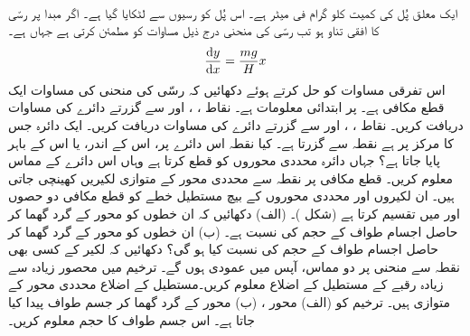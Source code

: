 \\
ایک معلق پُل کی کمیت  کلو گرام فی میٹر ہے۔ اس پُل کو رسیوں سے لٹکایا گیا ہے۔ اگر مبدا پر رسّی کا افقی تناو  ہو تب رسّی کی منحنی درج ذیل مساوات کو مطمئن کرتی ہے جہاں  ہے۔
\begin{align*}
\frac{\dif y}{\dif x}=\frac{mg}{H}x
\end{align*}
اس تفرقی مساوات کو حل کرتے ہوئے دکھائیں کہ رسّی کی منحنی کی مساوات ایک قطع مکافی ہے۔  پر  ابتدائی معلومات ہے۔
نقاط ، ،  اور  سے گزرتے دائرے کی مساوات دریافت کریں۔
نقاط ، ،  اور  سے گزرتے دائرے کی مساوات دریافت کریں۔
ایک دائرہ جس کا مرکز  پر ہے نقطہ  سے گزرتا ہے۔  کیا نقطہ  اس دائرے پر، اس کے اندر،  یا اس کے باہر پایا جاتا ہے؟
جہاں دائرہ  محددی محوروں کو قطع کرتا ہے وہاں اس دائرے کے مماس معلوم کریں۔ 
قطع مکافی  پر نقطہ  سے محددی محور کے متوازی لکیریں کھینچی جاتی ہیں۔ ان لکیروں اور محددی محوروں کے بیچ مستطیل خطے  کو قطع مکافی دو حصوں  اور  میں تقسیم کرتا ہے (شکل )۔ (الف) دکھائیں کہ ان خطوں کو محور  کے گرد گھما کر حاصل اجسام طواف کے حجم کی نسبت  ہے۔ (ب) ان خطوں کو محور  کے گرد گھما کر حاصل اجسام طواف کے حجم کی نسبت کیا ہو گی؟
دکھائیں کہ لکیر  کے   کسی بھی نقطہ سے منحنی  پر دو مماس، آپس میں عمودی ہوں گے۔  
ترخیم  میں محصور زیادہ سے زیادہ رقبے کے مستطیل کے اضلاع معلوم کریں۔مستطیل کے اضلاع محددی محور کے متوازی ہیں۔ 
ترخیم  کو (الف) محور ، (ب) محور  کے گرد گھما کر جسم طواف پیدا کیا جاتا ہے۔ اس جسم طواف  کا حجم معلوم کریں۔
